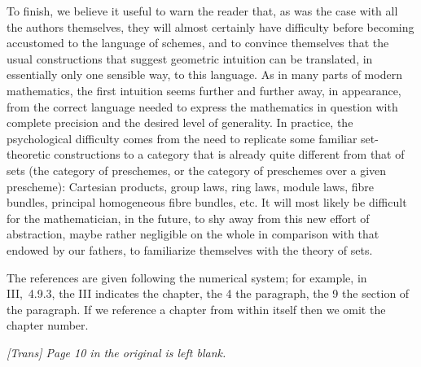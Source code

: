 \sectionbreak

To finish, we believe it useful to warn the reader that, as was the case with
all the authors themselves, they will almost certainly have difficulty before
becoming accustomed to the language of schemes, and to convince themselves that
the usual constructions that suggest geometric intuition can be translated, in
essentially only one sensible way, to this language. As in many parts of modern
mathematics, the first intuition seems further and further away, in appearance,
from the correct language needed to express the mathematics in question with
complete precision and the desired level of generality. In practice, the
psychological difficulty comes from the need to replicate some familiar
set-theoretic constructions to a category that is already quite different from
that of sets (the category of preschemes, or the category of preschemes over a
given prescheme): Cartesian products, group laws, ring laws, module laws, fibre
bundles, principal homogeneous fibre bundles, etc. It will most likely
be difficult for the mathematician, in the future, to shy away from this new
effort of abstraction, maybe rather negligible on the whole in comparison with
that endowed by our fathers, to familiarize themselves with the theory of sets.

\sectionbreak

The references are given following the numerical system; for example, in
III,~4.9.3, the III indicates the chapter, the 4 the paragraph, the 9 the
section of the paragraph. If we reference a chapter from within itself then we
omit the chapter number.

\bigskip

{\em [Trans] Page 10 in the original is left blank.}






